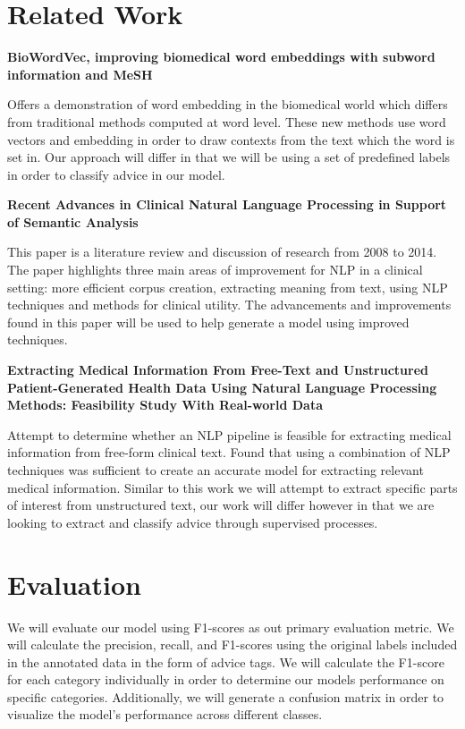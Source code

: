 \documentclass[11pt]{article}
\begin{document}
\section{Related Work}
\textbf{BioWordVec, improving biomedical word embeddings with subword information and MeSH}

Offers a demonstration of word embedding in the biomedical world which differs from traditional methods computed at word level. These new methods use word vectors and embedding in order to draw contexts from the text which the word is set in. Our approach will differ in that we will be using a set of predefined labels in order to classify advice in our model.

\textbf{Recent Advances in Clinical Natural Language Processing in Support of Semantic Analysis}

This paper is a literature review and discussion of research from 2008 to 2014. The paper highlights three main areas of improvement for NLP in a clinical setting: more efficient corpus creation, extracting meaning from text, using NLP techniques and methods for clinical utility. The advancements and improvements found in this paper will be used to help generate a model using improved techniques.

\textbf{Extracting Medical Information From Free-Text and Unstructured Patient-Generated Health Data Using Natural Language Processing Methods: Feasibility Study With Real-world Data }

Attempt to determine whether an NLP pipeline is feasible for extracting  medical information from free-form clinical text. Found that using a combination of NLP techniques was sufficient to create an accurate model for extracting relevant medical information. Similar to this work we will attempt to extract specific parts of interest from unstructured text, our work will differ however in that we are looking to extract and classify advice through supervised processes.

\section{Evaluation}
We will evaluate our model using F1-scores as out primary evaluation metric. We will calculate the precision, recall, and F1-scores using the original labels included in the annotated data in the form of advice tags. We will calculate the F1-score for each category individually in order to determine our models performance on specific categories. Additionally, we will generate a confusion matrix in order to visualize the model's performance across different classes. 
\end{document}

